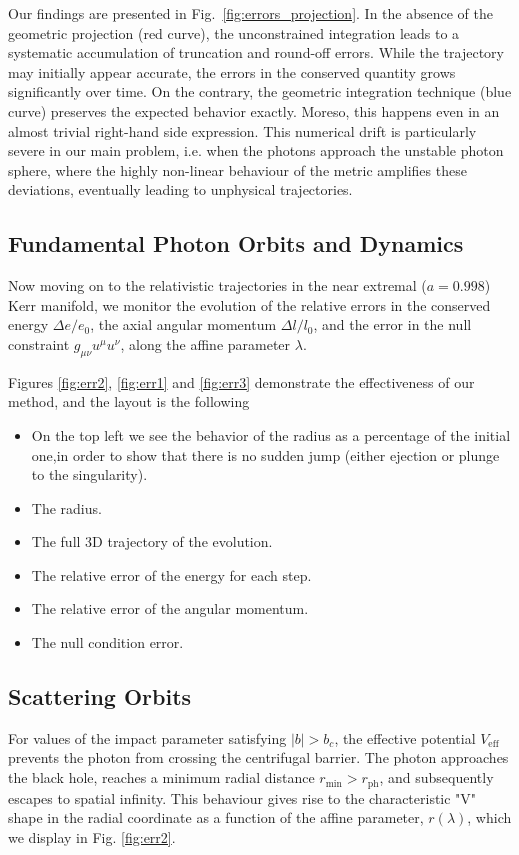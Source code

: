 \documentclass[11pt]{book}
\begin{document}
Our findings are presented in Fig.~\ref{fig:errors_projection}. In the absence of the geometric projection (red curve), the unconstrained integration leads to a systematic accumulation of truncation and round-off errors. While the trajectory may initially appear accurate, the errors in the conserved quantity grows significantly over time. On the contrary, the geometric integration technique (blue curve) preserves the expected behavior exactly. Moreso, this happens even in an almost trivial right-hand side expression. This numerical drift is particularly severe in our main problem, i.e. when the photons approach the unstable photon sphere, where the highly non-linear behaviour of the metric amplifies these deviations, eventually leading to unphysical trajectories.

\subsection{Fundamental Photon Orbits and Dynamics}

Now moving on to the relativistic trajectories in the near extremal ($a=0.998$) Kerr manifold, we monitor the evolution of the relative errors in the conserved energy $\Delta e / e_0$, the axial angular momentum $\Delta l / l_0$, and the error in the null constraint $g_{\mu\nu}u^\mu u^\nu$, along the affine parameter $\lambda$. 


Figures \ref{fig:err2}, \ref{fig:err1} and \ref{fig:err3} demonstrate the effectiveness of our method, and the layout is the following
\begin{itemize}[align=left]
    \item[\textbf{Top Left}:] 
    {On the top left we see the behavior of the radius as a percentage of the initial one,in order to show that there is no sudden jump (either ejection or plunge to the singularity)}.
    \item[\textbf{Top Middle}:] The radius.
    
    \item[\textbf{Top Right}:] The full 3D trajectory of the evolution.
    \item[\textbf{Bottom Left}:] The relative error of the energy for each step.
    \item[\textbf{Bottom Middle}:] The relative error of the angular momentum.
    \item[\textbf{Bottom Right}:] The null condition error.
\end{itemize}


\subsection{Scattering Orbits}
For values of the impact parameter satisfying \(|b| > b_c\), the effective potential \(V_{\text{eff}}\) prevents the photon from crossing the centrifugal barrier. The photon approaches the black hole, reaches a minimum radial distance \(r_{\min} > r_{\text{ph}}\), and subsequently escapes to spatial infinity. This behaviour gives rise to the characteristic "V" shape in the radial coordinate as a function of the affine parameter, \(r(\lambda)\), which we display in Fig. \ref{fig:err2}. 
\end{document}
